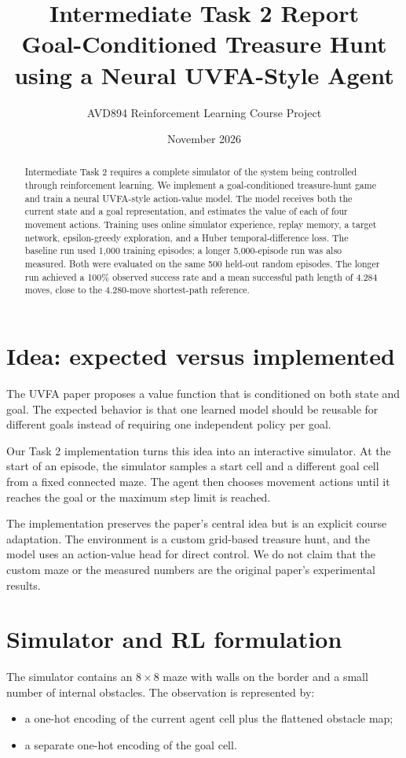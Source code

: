 \documentclass[11pt,a4paper]{article}
\title{Intermediate Task 2 Report\\\large Goal-Conditioned Treasure Hunt using a Neural UVFA-Style Agent}
\author{AVD894 Reinforcement Learning Course Project}
\date{November 2026}
\begin{document}
\maketitle

\begin{abstract}
Intermediate Task 2 requires a complete simulator of the system being controlled
through reinforcement learning. We implement a goal-conditioned treasure-hunt
game and train a neural UVFA-style action-value model. The model receives both
the current state and a goal representation, and estimates the value of each of
four movement actions. Training uses online simulator experience, replay memory,
a target network, epsilon-greedy exploration, and a Huber temporal-difference
loss. The baseline run used 1,000 training episodes; a longer 5,000-episode run was
also measured. Both were evaluated on the same 500 held-out random episodes.
The longer run achieved a 100\% observed success rate and a mean successful
path length of 4.284 moves, close to the 4.280-move shortest-path reference.
\end{abstract}

\section{Idea: expected versus implemented}

The UVFA paper proposes a value function that is conditioned on both state and
goal. The expected behavior is that one learned model should be reusable for
different goals instead of requiring one independent policy per goal.

Our Task 2 implementation turns this idea into an interactive simulator. At the
start of an episode, the simulator samples a start cell and a different goal
cell from a fixed connected maze. The agent then chooses movement actions until
it reaches the goal or the maximum step limit is reached.

The implementation preserves the paper's central idea but is an explicit course
adaptation. The environment is a custom grid-based treasure hunt, and the model
uses an action-value head for direct control. We do not claim that the custom
maze or the measured numbers are the original paper's experimental results.

\section{Simulator and RL formulation}

The simulator contains an $8\times8$ maze with walls on the border and a small
number of internal obstacles. The observation is represented by:
\begin{itemize}[leftmargin=*]
    \item a one-hot encoding of the current agent cell plus the flattened obstacle map;
    \item a separate one-hot encoding of the goal cell.
\end{itemize}
\end{document}
